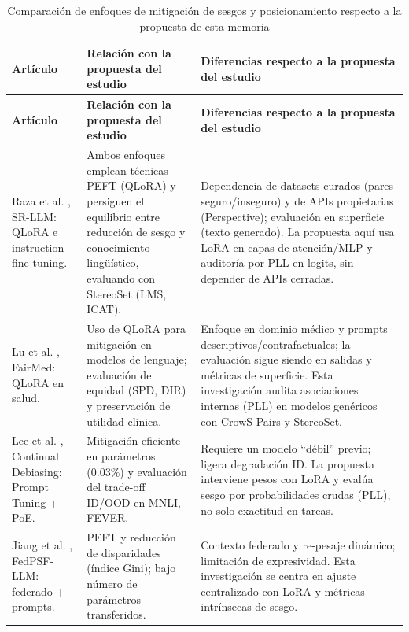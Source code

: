 \documentclass[12pt,a4paper]{report}
\begin{document}
\begingroup
\small
\renewcommand{\arraystretch}{1.35}
\setlength{\LTpre}{0pt}
\setlength{\LTpost}{0pt}
\begin{longtable}{|P{4cm}|P{5.2cm}|P{5.2cm}|}
\caption{Comparación de enfoques de mitigación de sesgos y posicionamiento respecto a la propuesta de esta memoria} \label{tab:estado_arte_mitigacion} \\
\hline
\textbf{Artículo} &
\textbf{Relación con la propuesta del estudio} &
\textbf{Diferencias respecto a la propuesta del estudio} \\
\hline
\endfirsthead

\hline
\textbf{Artículo} &
\textbf{Relación con la propuesta del estudio} &
\textbf{Diferencias respecto a la propuesta del estudio} \\
\hline
\endhead

\hline
\endfoot

Raza et al. \cite{raza_developing_2025}, SR-LLM: QLoRA e instruction fine-tuning. &
Ambos enfoques emplean técnicas PEFT (QLoRA) y persiguen el equilibrio entre reducción de sesgo y conocimiento lingüístico, evaluando con StereoSet (LMS, ICAT). &
Dependencia de datasets curados (pares seguro/inseguro) y de APIs propietarias (Perspective); evaluación en superficie (texto generado). La propuesta aquí usa LoRA en capas de atención/MLP y auditoría por PLL en logits, sin depender de APIs cerradas. \\
\hline

Lu et al. \cite{lu_toward_2025}, FairMed: QLoRA en salud. &
Uso de QLoRA para mitigación en modelos de lenguaje; evaluación de equidad (SPD, DIR) y preservación de utilidad clínica. &
Enfoque en dominio médico y prompts descriptivos/contrafactuales; la evaluación sigue siendo en salidas y métricas de superficie. Esta investigación audita asociaciones internas (PLL) en modelos genéricos con CrowS-Pairs y StereoSet. \\
\hline

Lee et al. \cite{lee_continual_2025}, Continual Debiasing: Prompt Tuning + PoE. &
Mitigación eficiente en parámetros (0.03\%) y evaluación del trade-off ID/OOD en MNLI, FEVER. &
Requiere un modelo ``débil'' previo; ligera degradación ID. La propuesta interviene pesos con LoRA y evalúa sesgo por probabilidades crudas (PLL), no solo exactitud en tareas. \\
\hline

Jiang et al. \cite{jiang_fine-tuning_2026}, FedPSF-LLM: federado + prompts. &
PEFT y reducción de disparidades (índice Gini); bajo número de parámetros transferidos. &
Contexto federado y re-pesaje dinámico; limitación de expresividad. Esta investigación se centra en ajuste centralizado con LoRA y métricas intrínsecas de sesgo. \\
\hline


\end{longtable}
\end{document}
